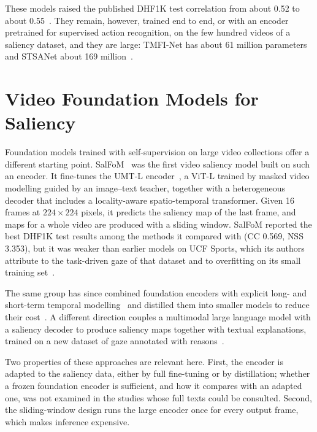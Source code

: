 These models raised the published DHF1K test correlation from about 0.52 to
about 0.55~\cite{moradi2024salfom}. They remain, however, trained end to end,
or with an encoder pretrained for supervised action recognition, on the few
hundred videos of a saliency dataset, and they are large: TMFI-Net has about 61
million parameters and STSANet about 169 million~\cite{girmaji2025minimalistic}.

\section{Video Foundation Models for Saliency}\label{sec:related-vfm}

Foundation models trained with self-supervision on large video collections
offer a different starting point. SalFoM~\cite{moradi2024salfom} was the first
video saliency model built on such an encoder. It fine-tunes the \acrshort{UMT}-L
encoder~\cite{li2023unmasked}, a \acrshort{ViT}-L trained by masked video modelling guided
by an image--text teacher, together with a heterogeneous decoder that includes
a locality-aware spatio-temporal transformer. Given 16 frames at
$224\times224$ pixels, it predicts the saliency map of the last frame, and
maps for a whole video are produced with a sliding window. SalFoM reported the
best DHF1K test results among the methods it compared with (\acrshort{CC} 0.569, \acrshort{NSS}
3.353), but it was weaker than earlier models on UCF Sports, which its authors
attribute to the task-driven gaze of that dataset and to overfitting on its
small training set~\cite{moradi2024salfom}.

The same group has since combined foundation encoders with explicit
long- and short-term temporal modelling~\cite{moradi2026lstd} and distilled them
into smaller models to reduce their cost~\cite{moradi2026knowledge}. A
different direction couples a multimodal large language model with a saliency
decoder to produce saliency maps together with textual explanations, trained on
a new dataset of gaze annotated with reasons~\cite{wu2026explainable}.

Two properties of these approaches are relevant here. First, the encoder is
adapted to the saliency data, either by full fine-tuning or by distillation;
whether a frozen foundation encoder is sufficient, and how it compares with an
adapted one, was not examined in the studies whose full texts could be
consulted. Second, the sliding-window design runs the large encoder once for
every output frame, which makes inference expensive.

